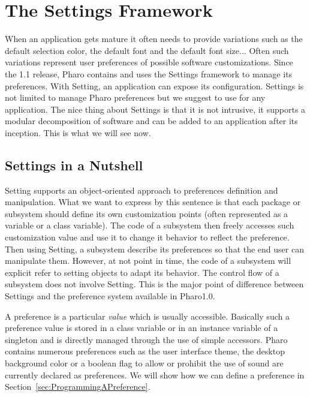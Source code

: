 \documentclass[a4paper,10pt,twoside]{book}
\begin{document}
\fi
\renewcommand{\nnbb}[2]{} %
\sloppy
\newcommand{\apl}[1]{\nnbb{Alain}{#1}} %
\chapter{The Settings Framework}

When an application gets mature it often needs to provide variations such as the default selection color, the default font and the default font size... Often such variations represent user preferences of possible software customizations. 
Since the 1.1 release, Pharo contains and uses the Settings framework to manage its preferences. With Setting, an application can expose its configuration. Settings is not limited to manage Pharo preferences but we suggest to use for any application. The nice thing about Settings is that it is not intrusive, it supports a modular decomposition of software and can be added to an application after its inception. This is what we will see now.

\section{Settings in a Nutshell}

Setting supports an object-oriented approach to preferences definition and manipulation. What we want to express by this sentence is that each package or subsystem should define its own customization points (often represented as a variable or a class variable). The code of a subsystem then freely accesses such customization value and use it to change it behavior to reflect the preference. Then using Setting, a subsystem describe its preferences so that the end user can manipulate them. However, at not point in time, the code of a subsystem will explicit refer to setting objects to adapt its behavior. The control flow of a subsystem does not involve Setting. This is the major point of difference between Settings and the preference system available in Pharo1.0.

A preference is a particular \emph{value} which is usually accessible. Basically such a preference value is stored in a class variable or in an instance variable of a singleton and is directly managed through the use of simple accessors. Pharo contains numerous preferences such as the user interface theme, the desktop background color or a boolean flag to allow or prohibit the use of sound are currently declared as preferences. We will show how we can define a preference in Section~\ref{sec:ProgrammingAPreference}. 
\end{document}
